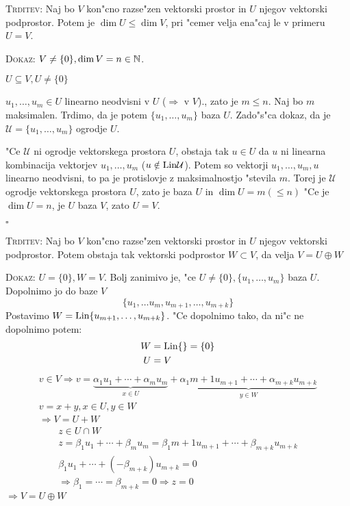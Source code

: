 \textsc{Trditev:} Naj bo $V$ kon"cno razse"zen vektorski prostor in $U$ njegov vektorski podprostor. Potem je $\dim U \leq \dim V$, pri "cemer velja ena"caj le v primeru $U = V$.

\textsc{Dokaz:} $V \neq \{0\}, \dim V = n \in \mathbb{N}$.

$U \subseteq V, U \neq \{0\}$

$u_1, \ldots, u_m \in U$ linearno neodvisni v $U$ ($\Rightarrow$ v $V$)., zato je $m \leq n$. Naj bo $m$ maksimalen. Trdimo, da je potem $\{u_1, \ldots, u_m\}$ baza $U$. Zado"s"ca dokaz, da je $\mathcal{U} = \{u_1, \ldots, u_m\}$ ogrodje $U$.

"Ce $\mathcal{U}$ ni ogrodje vektorskega prostora $U$, obstaja tak $u \in U$ da $u$ ni linearna kombinacija vektorjev $u_1, \ldots, u_m$ ($u \notin \text{Lin} \mathcal{U}$). Potem so vektorji $u_1, \ldots, u_m, u$ linearno neodvisni, to pa je protislovje z maksimalnostjo "stevila $m$. Torej je $\mathcal{U}$ ogrodje vektorskega prostora $U$, zato je baza $U$ in $\dim U = m (\leq n)$ "Ce je $\dim U = n$, je $U$ baza $V$, zato $U = V$.

\hfill $\square$

\textsc{Trditev:} Naj bo $V$ kon"cno razse"zen vektorski prostor in $U$ njegov vektorski podprostor. Potem obstaja tak vektorski podprostor $W \subset V$, da velja $V = U \oplus W$

\textsc{Dokaz:} $U = \{0\}, W = V$. Bolj zanimivo je, "ce $U \neq \{0\}, \{u_1, \ldots, u_m\}$ baza $U$. Dopolnimo jo do baze $V$
\begin{equation*}
\{u_1, \ldots u_m, u_{m+1}, \ldots, u_{m+k}\}
\end{equation*}
Postavimo $W = \text{Lin} \{u_{m+1}, \ldots, u_{m+k}\}$. "Ce dopolnimo tako, da ni"c ne dopolnimo potem:
\begin{align*}
	W &= \text{Lin}\{\} = \{0\} \\
	U &= V
\end{align*}
\begin{gather*}
v \in V \Rightarrow v = \underbrace{\alpha_1 u_1 + \cdots + \alpha_m u_m}_{x \in U} +\underbrace{\alpha_1{m+1} u_{m+1} + \cdots + \alpha_{m+k} u_{m+k}}_{y \in W} \\
v = x + y, x \in U, y \in W \\
\Rightarrow V = U + W
\end{gather*}
\begin{gather*}
z \in U \cap W \\
z = \beta_1 u_1 + \cdots + \beta_m u_m = \beta_1{m+1} u_{m+1} + \cdots + \beta_{m+k} u_{m+k} \\
\beta_1 u_1 + \cdots + (-\beta_{m+k})u_{m+k} = 0 \\
\Rightarrow \beta_1 = \cdots = \beta_{m+k} = 0 \Rightarrow z = 0
\end{gather*}
$\Rightarrow V = U \oplus W$

